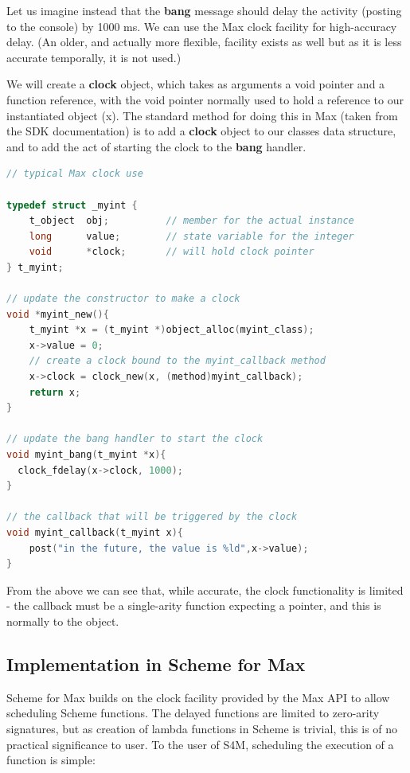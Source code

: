 \documentclass[acmsmall]{acmart}
\begin{document}
Let us imagine instead that the \textbf{bang} message should delay the activity
(posting to the console) by 1000 ms. We can use the Max clock facility for high-accuracy
delay. (An older, and actually more flexible, facility exists as well but as it is
less accurate temporally, it is not used.) 

We will create a \textbf{clock} object, which takes as arguments a void pointer and a function
reference, with the void pointer normally used to hold a reference to our instantiated
object (x). The standard method for doing this in Max (taken from the SDK documentation)
is to add a \textbf{clock} object to our classes data structure, and to add the act
of starting the clock to the \textbf{bang} handler.

\begin{lstlisting}[language=C]
// typical Max clock use

typedef struct _myint {
    t_object  obj;          // member for the actual instance 
    long      value;        // state variable for the integer
    void      *clock;       // will hold clock pointer
} t_myint;

// update the constructor to make a clock
void *myint_new(){
    t_myint *x = (t_myint *)object_alloc(myint_class);
    x->value = 0;
    // create a clock bound to the myint_callback method
    x->clock = clock_new(x, (method)myint_callback); 
    return x;
}

// update the bang handler to start the clock
void myint_bang(t_myint *x){
  clock_fdelay(x->clock, 1000);
}

// the callback that will be triggered by the clock
void myint_callback(t_myint x){
    post("in the future, the value is %ld",x->value);
}
\end{lstlisting}


From the above we can see that, while accurate, the clock functionality is limited -
the callback must be a single-arity function expecting a pointer, and this
is normally to the object.


\subsection{Implementation in Scheme for Max}

Scheme for Max builds on the clock facility provided by the Max API to allow scheduling
Scheme functions. The delayed functions are limited to zero-arity signatures, but as
creation of lambda functions in Scheme is trivial, this is of no practical significance to 
user. To the user of S4M, scheduling the execution of a function is simple:
\end{document}
